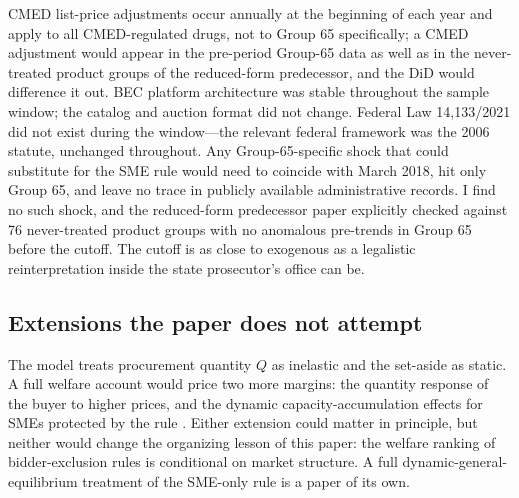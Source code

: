 CMED list-price adjustments occur annually at the beginning of each year and apply to all CMED-regulated drugs, not to Group 65 specifically; a CMED adjustment would appear in the pre-period Group-65 data as well as in the never-treated product groups of the reduced-form predecessor, and the DiD would difference it out. BEC platform architecture was stable throughout the sample window; the catalog and auction format did not change. Federal Law 14{,}133/2021 did not exist during the window---the relevant federal framework was the 2006 statute, unchanged throughout. Any Group-65-specific shock that could substitute for the SME rule would need to coincide with March 2018, hit only Group 65, and leave no trace in publicly available administrative records. I find no such shock, and the reduced-form predecessor paper explicitly checked against 76 never-treated product groups with no anomalous pre-trends in Group 65 before the cutoff. The cutoff is as close to exogenous as a legalistic reinterpretation inside the state prosecutor's office can be.

\subsection{Extensions the paper does not attempt}

The model treats procurement quantity $Q$ as inelastic and the set-aside as static. A full welfare account would price two more margins: the quantity response of the buyer to higher prices, and the dynamic capacity-accumulation effects for SMEs protected by the rule \citep{szerman2023,cabral2017}. Either extension could matter in principle, but neither would change the organizing lesson of this paper: the welfare ranking of bidder-exclusion rules is conditional on market structure. A full dynamic-general-equilibrium treatment of the SME-only rule is a paper of its own.
